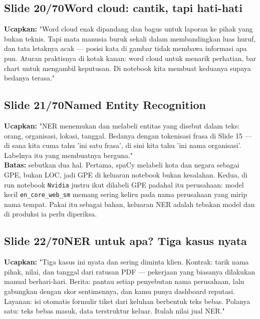 \documentclass[11pt]{article}
\renewcommand{\framebox}[1]{\colorbox{acc!15}{\textcolor{acc}{\textbf{#1}}}}
\begin{document}
\subsection*{\framebox{Slide 20/70}\quad Word cloud: cantik, tapi hati-hati}
\textbf{Ucapkan:} "Word cloud enak dipandang dan bagus untuk laporan ke pihak yang bukan teknis. Tapi mata manusia buruk sekali dalam membandingkan luas huruf, dan tata letaknya acak — posisi kata di gambar tidak membawa informasi apa pun. Aturan praktisnya di kotak kanan: word cloud untuk menarik perhatian, bar chart untuk mengambil keputusan. Di notebook kita membuat keduanya supaya bedanya terasa."\\[2pt]

\subsection*{\framebox{Slide 21/70}\quad Named Entity Recognition}
\textbf{Ucapkan:} "NER menemukan dan melabeli entitas yang disebut dalam teks: orang, organisasi, lokasi, tanggal. Bedanya dengan tokenisasi frasa di Slide 15 — di sana kita cuma tahu 'ini satu frasa', di sini kita tahu 'ini nama organisasi'. Labelnya itu yang membuatnya berguna."\\[2pt]
\textbf{Batas:} sebutkan dua hal. Pertama, spaCy melabeli kota dan negara sebagai GPE, bukan LOC, jadi GPE di keluaran notebook bukan kesalahan. Kedua, di run notebook \texttt{Nvidia} justru ikut dilabeli GPE padahal itu perusahaan: model kecil \texttt{en\_core\_web\_sm} memang sering keliru pada nama perusahaan yang mirip nama tempat. Pakai itu sebagai bahan, keluaran NER adalah tebakan model dan di produksi ia perlu diperiksa.\\[2pt]

\subsection*{\framebox{Slide 22/70}\quad NER untuk apa? Tiga kasus nyata}
\textbf{Ucapkan:} "Tiga kasus ini nyata dan sering diminta klien. Kontrak: tarik nama pihak, nilai, dan tanggal dari ratusan PDF — pekerjaan yang biasanya dilakukan manual berhari-hari. Berita: pantau setiap penyebutan nama perusahaan, lalu gabungkan dengan skor sentimennya, dan kamu punya dashboard reputasi. Layanan: isi otomatis formulir tiket dari keluhan berbentuk teks bebas. Polanya satu: teks bebas masuk, data terstruktur keluar. Itulah nilai jual NER."\\[2pt]
\end{document}
